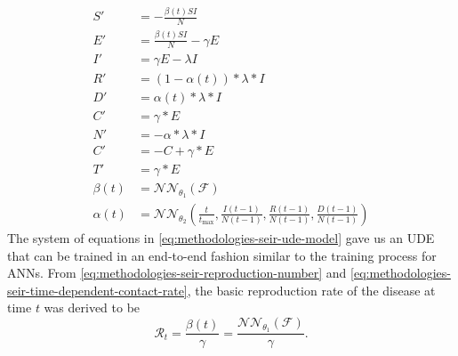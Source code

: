\begin{equation}
    \begin{aligned}
        S' &= - \frac{\beta(t) SI}{N} \\
        E' &= \frac{\beta(t) SI}{N} - \gamma E \\
        I' &= \gamma E - \lambda I \\
        R' &= (1 - \alpha(t)) * \lambda * I \\
        D' &= \alpha(t) * \lambda * I \\
        C' &= \gamma * E \\
        N' &= - \alpha * \lambda * I \\
        C' &= -C + \gamma * E \\
        T' &= \gamma * E \\
        \beta(t) &= \mathcal{NN}_{\theta_1}(\mathcal{F}) \\
        \alpha(t) &= \mathcal{NN}_{\theta_2} (\frac{t}{t_\text{max}}, \frac{I(t-1)}{N(t-1)}, \frac{R(t-1)}{N(t-1)}, \frac{D(t-1)}{N(t-1)})
    \end{aligned}
    \label{eq:methodologies-seir-ude-model}
\end{equation}
The system of equations in \autoref{eq:methodologies-seir-ude-model} gave us an \gls{UDE} \cite{rackauckasUniversalDifferentialEquations2020} that can be trained in an end-to-end fashion similar to the training process for \glspl{ANN}.
From \autoref{eq:methodologies-seir-reproduction-number} and \autoref{eq:methodologies-seir-time-dependent-contact-rate}, the basic reproduction rate of the disease at time $t$ was derived to be
\begin{equation*}
    \mathcal{R}_t = \frac{\beta(t)}{\gamma} = \frac{\mathcal{NN}_{\theta_1}(\mathcal{F})}{\gamma}.
\end{equation*}

